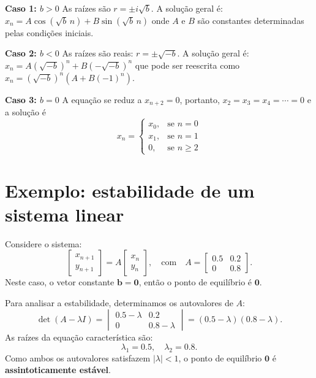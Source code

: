 \documentclass{article}
\begin{document}
\textbf{Caso 1: \( b>0 \)} As raízes são \( r = \pm i\sqrt{b} \).  A
solução geral é:
\( x_n = A \cos(\sqrt{b}\, n) + B \sin(\sqrt{b}\, n) \) onde \( A \) e
\( B \) são constantes determinadas pelas condições iniciais.
    
\textbf{Caso 2: \( b<0 \)} As raízes são reais:
\( r = \pm \sqrt{-b} \).  A solução geral é:
\( x_n = A (\sqrt{-b})^n + B (-\sqrt{-b})^n \) que pode ser reescrita
como \( x_n = (\sqrt{-b})^n (A + B(-1)^n) \).

\textbf{Caso 3: \( b=0 \)} A equação se reduz a \( x_{n+2} = 0 \),
portanto, \( x_2 = x_3 = x_4 = \cdots = 0 \) e a solução é    
\[
  x_n =
  \begin{cases}
    x_0, & \text{se } n=0 \\
    x_1, & \text{se } n=1 \\
    0, & \text{se } n \geq 2
  \end{cases}
\]


\section{Exemplo: estabilidade de um sistema linear}

Considere o sistema:
\begin{equation}
\begin{bmatrix}
x_{n+1} \\
y_{n+1}
\end{bmatrix}
=
A
\begin{bmatrix}
x_n \\
y_n
\end{bmatrix}, \quad \text{com} \quad
A = 
\begin{bmatrix}
0.5 & 0.2 \\
0   & 0.8
\end{bmatrix}.
\end{equation}
Neste caso, o vetor constante $\bm{b} = \bm{0}$, então o ponto de equilíbrio é $\bm{0}$.

Para analisar a estabilidade, determinamos os autovalores de $A$:
\[
\det(A - \lambda I) = 
\begin{vmatrix}
0.5 - \lambda & 0.2 \\
0 & 0.8 - \lambda
\end{vmatrix}
= (0.5 - \lambda)(0.8 - \lambda).
\]
As raízes da equação característica são:
\[
\lambda_1 = 0.5, \quad \lambda_2 = 0.8.
\]
Como ambos os autovalores satisfazem $|\lambda| < 1$, o ponto de
equilíbrio $\bm{0}$ é \textbf{assintoticamente estável}.
\end{document}

